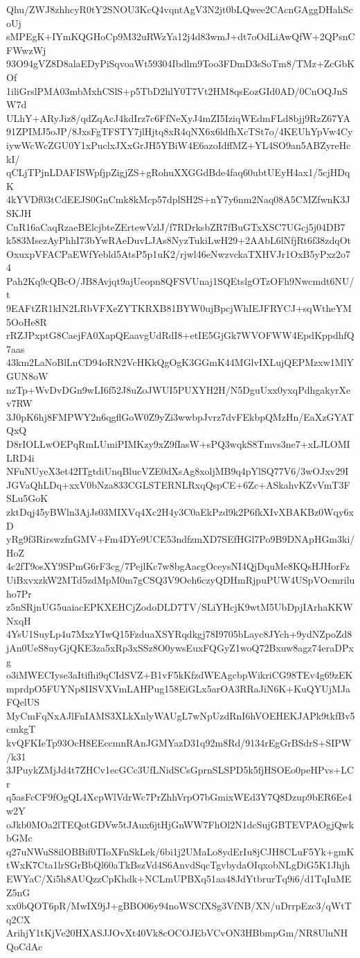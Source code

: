 Qhu/ZWJ8zhhcyR0tY2SNOU3KcQ4vqntAgV3N2jt0bLQwee2CAcnGAggDHahScoUj
sMPEgK+IYmKQGHoCp9M32uRWzYa12j4d83wmJ+dt7oOdLiAwQfW+2QPsnCFWwzWj
93O94gVZ8D8alaEDyPiSqvoaWt59304Ibdlm9Too3FDmD3sSoTm8/TMz+ZcGbKOf
1iliGrslPMA03mbMxhCSlS+p5TbD2hlY0T7Vt2HM8qsEozGId0AD/0CnOQJnSW7d
ULhY+ARyJiz8/qdZqAcJ4kdIrz7c6FfNeXyJ4mZI5IziqWEdmFLd8bjj9RzZ67YA
91ZPIMJ5oJP/8JxsFgTFSTY7jlHjtq8xR4qNX6x6ldfhXcTSt7o/4KEUhYpVw4Cy
iywWcWcZGU0Y1xPuclxJXxGrJH5YBiW4E6azoIdffMZ+YL4SO9an5ABZyreHckI/
qCLjTPjnLDAFISWpfjpZigjZS+gRohuXXGGdBde4faq60ubtUEyH4ax1/5cjHDqK
4kYVDf03tCdEEJS0GnCmk8kMcp57dplSH2S+nY7y6nm2Naq08A5CMZfwnK3JSKJH
CnR16aCaqRzaeBElcjbteZErtewVzlJ/f7RDrksbZR7fBuGTxXSC7UGcj5j04DB7
k583MsezAyPhhI73bYwRAeDuvLJAs8NyzTukiLwH29+2AAbL6lNfjRt6f38zdqOt
OxuxpVFACPaEWfYebld5AtsP5p1uK2/rjwl46eNwzvckaTXHVJr1OxB5yPxz2o74
Pah2Kq9cQBcO/JB8Avjqt9ajUeopn8QFSVUnaj1SQEtslgOTzOFh9Nwcmdt6NU/t
9EAFtZR1kIN2LRbVFXeZYTKRXB81BYW0ujBpcjWhIEJFRYCJ+sqWtheYM5OoHe8R
rRZJPxptG8CaejFA0XapQEaavgUdRdI8+etIE5GjGk7WVOFWW4EpdKppdhfQ7aas
43km2LaNoBlLnCD94oRN2VcHKkQgOgK3GGmK44MGlvIXLujQEPMzxw1MlYGUN8oW
nzTp+WvDvDGn9wLI6f52J8uZoJWUI5PUXYH2H/N5DguUxx0yxqPdhgakyrXev7RW
3J0pK6hj8FMPWY2n6qgflGoW0Z9yZi3wwbpJvrz7dvFEkbpQMzHn/EaXzGYATQxQ
D8rIOLLwOEPqRmLUmiPIMKzy9xZ9fIasW+sPQ3wqkS8Tmvs3ne7+xLJLOMILRD4i
NFuNUyeX3et42ITgtdiUnqBlucVZE0dXsAg8xoljMB9q4pYlSQ77V6/3wOJxv29I
JGVaQhLDq+xxV0bNza833CGLSTERNLRxqQspCE+6Zc+ASkahvKZvVmT3FSLu5GoK
zktDqj45yBWln3AjJs03MIXVq4Xc2H4y3C0aEkPzd9k2P6fkXIvXBAKBz0Wqy6xD
yRg9f3RirswzfnGMV+Fm4DYe9UCE53ndfzmXD7SEfHGl7Po9B9DNApHGm3ki/HoZ
4c2fT9osXY9SPmG6rF3cg/7PejlKc7w8bgAacgOceysNI4QjDquMe8KQsHJHorFz
UiBxvxzkW2MTd5zdMpM0m7gCSQ3V9Oeh6czyQDHmRjpuPUW4USpVOcmriluho7Pr
z5nSRjnUG5uaiacEPKXEHCjZodoDLD7TV/SLiYHcjK9wtM5UbDpjIArhaKKWNxqH
4YsU1SuyLp4u7MxzYIwQ15FzduaXSYRqdkgj78I9705bLayc8JYch+9ydNZpoZd8
jAn0UeS8uyGjQKE3za5xRp3xSSz8O0ywsEuxFQGyZ1woQ72Bxuw8agz74eraDPxg
o3iMWECIyse3aItifhi9qCIdSVZ+B1vF5kKfzdWEAgcbpWikriCG98TEv4g69zEK
mprdpO5FUYNp8IISVXVmLAHPug158EiGLx5arOA3RRaJiN6K+KuQYUjMJaFQelUS
MyCmFqNxAJlFnIAMS3XLkXnlyWAUgL7wNpUzdRnI6hVOEHEKJAPk9tkfBv5cmkgT
kvQFKIeTp93OcH8EEccmnRAnJGMYazD31q92m8Rd/9134rEgGrBSdrS+SIPW/k31
3JPuykZMjJd4t7ZHCv1ecGCc3UfLNidSCsGprnSLSPD5k5fjHSOEo0peHPvs+LCr
q5asFcCF9fOgQL4XcpWlVdrWc7PrZhhVrpO7bGmixWEd3Y7Q8Dzup9bER6Ee4w2Y
oJkb0MOa2lTEQotGDVw5tJAux6jtHjGnWW7FhOl2N1dcSujGBTEVPAOgjQwkbGMc
q27uNWuS8ilOBBif0TIoXFnSkLek/6bi1j2UMaLo8ydErIu8jCJH8CLuF5Yk+gmK
tWxK7Cta1lrSGrBbQl60aTkBszVd4S6AnvdSqcTgvbydaOIqxobNLgDiG5K1Jhjh
EWYaC/Xi5h8AUQzzCpKhdk+NCLmUPBXq51aa48JdYtbrurTq9i6/d1TqIuMEZ5nG
xx0bQOT6pR/MwIX9jJ+gBBO06y94noWSCfXSg3VfNB/XN/uDrrpEzc3/qWtTq2CX
ArihjY1tKjVe20HXASJJOvXt40Vk8cOCOJEbVCvON3HBbmpGm/NR8UluNHQoCdAc
